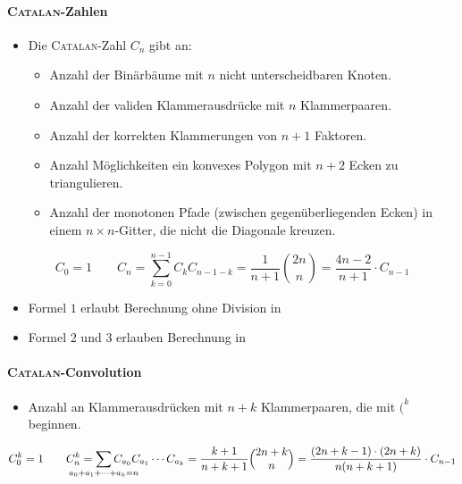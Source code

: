     \begin{methods}
	\end{methods}

    \begin{methods}
	\end{methods}


\paragraph{\textsc{Catalan}-Zahlen}
\begin{itemize}
	\item Die \textsc{Catalan}-Zahl $C_n$ gibt an:
	\begin{itemize}
		\item Anzahl der Binärbäume mit $n$ nicht unterscheidbaren Knoten.
		\item Anzahl der validen Klammerausdrücke mit $n$ Klammerpaaren.
		\item Anzahl der korrekten Klammerungen von $n+1$ Faktoren.
		\item Anzahl Möglichkeiten ein konvexes Polygon mit $n + 2$ Ecken zu triangulieren.
		\item Anzahl der monotonen Pfade (zwischen gegenüberliegenden Ecken) in
		einem $n \times n$-Gitter, die nicht die Diagonale kreuzen.
	\end{itemize}
\end{itemize}
\[C_0 = 1\qquad C_n = \sum\limits_{k = 0}^{n - 1} C_kC_{n - 1 - k} =
\frac{1}{n + 1}\binom{2n}{n} = \frac{4n - 2}{n+1} \cdot C_{n-1}\]
\begin{itemize}
	\item Formel $1$ erlaubt Berechnung ohne Division in 
	\item Formel $2$ und $3$ erlauben Berechnung in 
\end{itemize}

\paragraph{\textsc{Catalan}-Convolution}
\begin{itemize}
	\item Anzahl an Klammerausdrücken mit $n+k$ Klammerpaaren, die mit $(^k$ beginnen.
\end{itemize}
\[C^k_0 = 1\qquad C^k_n = \sum\limits_{\mathclap{a_0+a_1+\dots+a_k=n}} C_{a_0}C_{a_1}\cdots C_{a_k} =
\frac{k+1}{n+k+1}\binom{2n+k}{n} = \frac{(2n+k-1)\cdot(2n+k)}{n(n+k+1)} \cdot C_{n-1}\]

